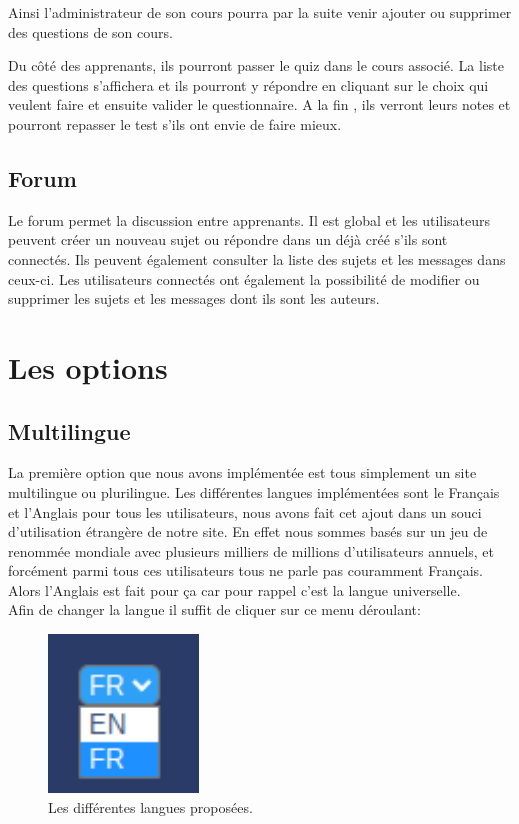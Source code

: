 \documentclass[a4paper,10pt]{article}
\begin{document}
Ainsi l'administrateur de son cours pourra par la suite venir ajouter ou supprimer des questions de son cours. 

Du côté des apprenants, ils pourront passer le quiz dans le cours associé. La liste des questions s'affichera et ils pourront y répondre en cliquant sur le choix qui veulent faire et ensuite valider le questionnaire.
A la fin , ils verront leurs notes et pourront repasser le test s'ils ont envie de faire mieux.
\subsection{Forum}
Le forum permet la discussion entre apprenants. Il est global et les utilisateurs peuvent créer un nouveau sujet ou répondre dans un déjà créé s'ils sont connectés. Ils peuvent également consulter la liste des sujets et les messages dans ceux-ci. Les utilisateurs connectés ont également la possibilité de modifier ou supprimer les sujets et les messages dont ils sont les auteurs. 


\section{Les options}
\subsection{Multilingue}
La première option que nous avons implémentée est tous simplement un site multilingue ou plurilingue. Les différentes langues implémentées sont le Français et l'Anglais pour tous les utilisateurs, nous avons fait cet ajout dans un souci d'utilisation étrangère de notre site. En effet nous sommes basés sur un jeu de renommée mondiale avec plusieurs milliers de millions d'utilisateurs annuels, et forcément parmi tous ces utilisateurs tous ne parle pas couramment Français. Alors l'Anglais est fait pour ça car pour rappel c'est la langue universelle.\\

Afin de changer la langue il suffit de cliquer sur ce menu déroulant:
\begin{figure}[!h]
\centerline{\includegraphics[width=4cm]{images/menuLangues.PNG}}
\caption{Les différentes langues proposées.}
\label{fig}
\end{figure}
\end{document}
